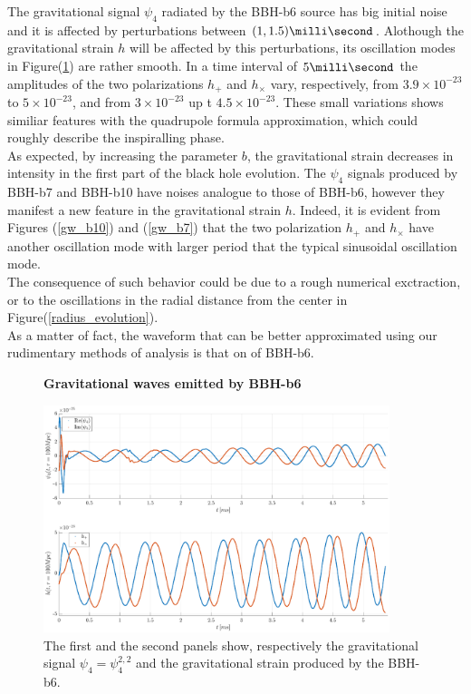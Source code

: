 The gravitational signal $\psi_4$ radiated by the BBH-b6 source has big initial noise and it is affected by perturbations between $(1,1.5) \milli \second$. 
Alothough the gravitational strain $h$ will be affected by this perturbations, its oscillation modes in Figure(\ref{gw_b6}) are rather smooth. 
In a time interval of $5 \milli \second$ the amplitudes of the two polarizations $h_+$ and $h_{\times}$ vary, respectively, from $3.9\times 10^{-23}$ to $5\times 10^{-23}$, and from $3\times 10^{-23}$ up t $4.5\times 10^{-23}$. 
These small variations shows similiar features with the quadrupole formula approximation, which could roughly describe the inspiralling phase.\\
As expected, by increasing the parameter $b$, the gravitational strain decreases in intensity in the first part of the black hole evolution.
The $\psi_4$ signals produced by BBH-b7 and BBH-b10 have noises analogue to those of BBH-b6, however they manifest  a new feature in the gravitational strain $h$.
Indeed, it is evident from Figures (\ref{gw_b10}) and (\ref{gw_b7}) that the two polarization $h_{+}$ and $h_{\times}$ have another oscillation mode with larger period that the typical sinusoidal oscillation mode.\\
The consequence of such behavior could be due to a rough numerical exctraction, or to the oscillations in the radial distance from the center in Figure(\ref{radius_evolution}).\\
As a matter of fact, the waveform that can be better approximated using our rudimentary methods of analysis is that on of BBH-b6.\par
\begin{figure}[H]
\centering
    \textbf{Gravitational waves emitted by BBH-b6}\par\medskip
\centering
\includegraphics[width=0.9\textwidth]{numerical_evolution/gw_b6.eps}
   \caption{The first and the second panels show, respectively the gravitational signal $\psi_4=\psi_4 ^{2,2}$ and the gravitational strain produced by the BBH-b6.}
      \label{gw_b6}
\end{figure}

